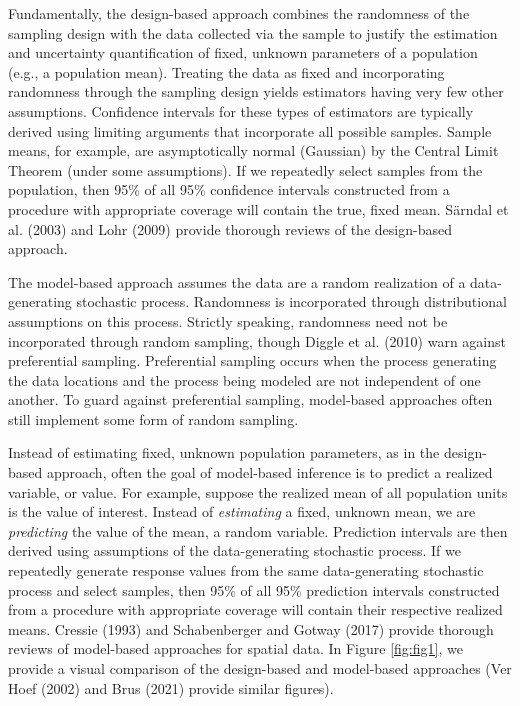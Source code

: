 \documentclass[]{elsarticle} %
\begin{document}
Fundamentally, the design-based approach combines the randomness of the
sampling design with the data collected via the sample to justify the
estimation and uncertainty quantification of fixed, unknown parameters
of a population (e.g., a population mean). Treating the data as fixed
and incorporating randomness through the sampling design yields
estimators having very few other assumptions. Confidence intervals for
these types of estimators are typically derived using limiting arguments
that incorporate all possible samples. Sample means, for example, are
asymptotically normal (Gaussian) by the Central Limit Theorem (under
some assumptions). If we repeatedly select samples from the population,
then 95\% of all 95\% confidence intervals constructed from a procedure
with appropriate coverage will contain the true, fixed mean. Särndal et
al. (2003) and Lohr (2009) provide thorough reviews of the design-based
approach.

The model-based approach assumes the data are a random realization of a
data-generating stochastic process. Randomness is incorporated through
distributional assumptions on this process. Strictly speaking,
randomness need not be incorporated through random sampling, though
Diggle et al. (2010) warn against preferential sampling. Preferential
sampling occurs when the process generating the data locations and the
process being modeled are not independent of one another. To guard
against preferential sampling, model-based approaches often still
implement some form of random sampling.

Instead of estimating fixed, unknown population parameters, as in the
design-based approach, often the goal of model-based inference is to
predict a realized variable, or value. For example, suppose the realized
mean of all population units is the value of interest. Instead of
\emph{estimating} a fixed, unknown mean, we are \emph{predicting} the
value of the mean, a random variable. Prediction intervals are then
derived using assumptions of the data-generating stochastic process. If
we repeatedly generate response values from the same data-generating
stochastic process and select samples, then 95\% of all 95\% prediction
intervals constructed from a procedure with appropriate coverage will
contain their respective realized means. Cressie (1993) and
Schabenberger and Gotway (2017) provide thorough reviews of model-based
approaches for spatial data. In Figure \ref{fig:fig1}, we provide a
visual comparison of the design-based and model-based approaches (Ver
Hoef (2002) and Brus (2021) provide similar figures).
\end{document}
